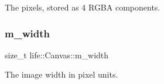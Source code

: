 The pixels, stored as 4 R\+G\+BA components. 

\mbox{\label{classlife_1_1_canvas_a6bbd32c0ee090231a2052e7cd882b55c}} 
\subsubsection{\texorpdfstring{m\_width}{m\_width}}
{\footnotesize\ttfamily size\+\_\+t life\+::\+Canvas\+::m\+\_\+width\hspace{0.3cm}{\ttfamily [private]}}



The image width in pixel units. 

